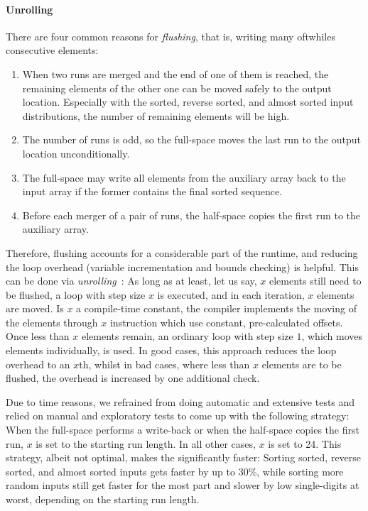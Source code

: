 \paragraph{Unrolling}
There are four common reasons for \emph{flushing}, that is, writing \Dash many oftwhiles \Dash consecutive elements:
\begin{enumerate}
	\item
	When two runs are merged and the end of one of them is reached, the remaining elements of the other one can be moved safely to the output location.
	Especially with the sorted, reverse sorted, and almost sorted input distributions, the number of remaining elements will be high.

	\item
	The number of runs is odd, so the full-space \MS{} moves the last run to the output location unconditionally.

	\item
	The full-space \MS{} may write all elements from the auxiliary array back to the input array if the former contains the final sorted sequence.

	\item
	Before each merger of a pair of runs, the half-space \MS{} copies the first run to the auxiliary array.
\end{enumerate}
Therefore, flushing accounts for a considerable part of the runtime, and reducing the loop overhead (variable incrementation and bounds checking) is helpful.
This can be done via \emph{unrolling}~\cite{penschuck2024personal}:
As long as at least, let us say, \(x\) elements still need to be flushed, a loop with step size \(x\) is executed, and in each iteration, \(x\) elements are moved.
Is \(x\) a compile-time constant, the compiler implements the moving of the elements through \(x\) instruction which use constant, pre-calculated offsets.
Once less than \(x\) elements remain, an ordinary loop with step size \(1\), which moves elements individually, is used.
In good cases, this approach reduces the loop overhead to an \(x\)th, whilst in bad cases, where less than \(x\) elements are to be flushed, the overhead is increased by one additional check.

Due to time reasons, we refrained from doing automatic and extensive tests and relied on manual and exploratory tests to come up with the following strategy:
When the full-space \MS{} performs a write-back or when the half-space \MS{} copies the first run, \(x\) is set to the starting run length.
In all other cases, \(x\) is set to 24.
This strategy, albeit not optimal, makes the \MS*{} significantly faster:
Sorting sorted, reverse sorted, and almost sorted inputs gets faster by up to 30\%, while sorting more random inputs still get faster for the most part and slower by low single-digits at worst, depending on the starting run length.




